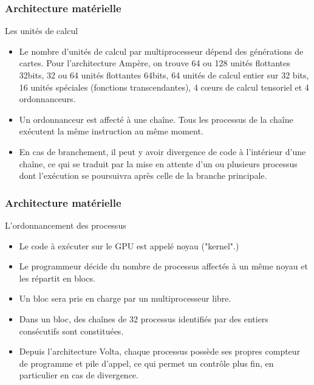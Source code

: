 \begin{frame}
    \frametitle{Architecture matérielle}
\begin{block}{Les unités de calcul}
   \begin{itemize}
    \item<+-> Le nombre d'unités de calcul par multiprocesseur dépend des générations de cartes. Pour l'architecture 
    Ampère, on trouve 64 ou 128 unités flottantes 32bits, 32 ou 64 unités flottantes 64bits, 64 unités de calcul entier
    sur 32 bits, 16 unités spéciales (fonctions transcendantes), 4 cœurs de calcul tensoriel et 4 ordonnanceurs.
    \item<+-> Un ordonnanceur est affecté à une chaîne. Tous les processus de la chaîne exécutent la même instruction
    au même moment.
    \item<+-> En cas de branchement, il peut y avoir divergence de code à l'intérieur d'une chaîne, ce qui se traduit par la 
    mise en attente d'un ou plusieurs processus dont l'exécution se poursuivra après celle de la branche principale. 
   \end{itemize} 
\end{block}
\end{frame}
\begin{frame}
    \frametitle{Architecture matérielle}
\begin{block}{L'ordonnancement des processus}
   \begin{itemize}
    \item<+-> Le code à exécuter sur le GPU est appelé noyau ("kernel".)
    \item<+-> Le programmeur décide du nombre de processus affectés à un même noyau et les répartit en blocs.
    \item<+-> Un bloc sera pris en charge par un multiprocesseur libre.
    \item<+-> Dans un bloc, des chaînes de 32 processus identifiés par des entiers consécutifs sont constituées. 
    \item<+-> Depuis l'architecture Volta, chaque processus possède ses propres compteur de programme et pile d'appel,
    ce qui permet un contrôle plus fin, en particulier en cas de divergence.
   \end{itemize} 
\end{block}
\end{frame}
